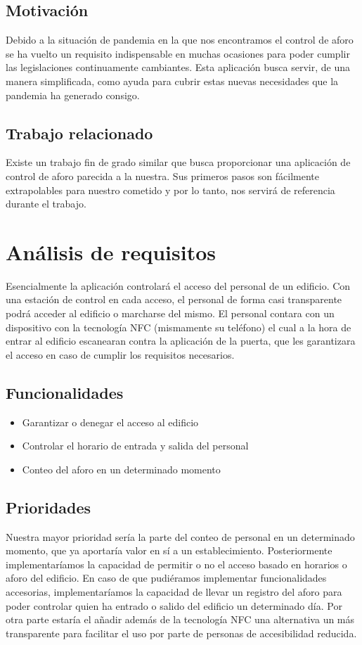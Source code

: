 \documentclass[a4paper,openright,12pt]{article}
\begin{document}
\subsection{Motivación}
Debido a la situación de pandemia en la que nos encontramos el control de aforo se ha vuelto un requisito indispensable en muchas ocasiones para poder cumplir las legislaciones continuamente cambiantes. Esta aplicación busca servir, de una manera simplificada, como ayuda para cubrir estas nuevas necesidades que la pandemia ha generado consigo.

\subsection{Trabajo relacionado}
Existe un trabajo fin de grado similar \cite{Safe-Events} que busca proporcionar una aplicación de control de aforo parecida a la nuestra. Sus primeros pasos son fácilmente extrapolables para nuestro cometido y por lo tanto, nos servirá de referencia durante el trabajo.




\section{Análisis de requisitos}
Esencialmente la aplicación controlará el acceso del personal de un edificio. Con una estación de control en cada acceso, el personal de forma casi transparente podrá acceder al edificio o marcharse del mismo.
El personal contara con un dispositivo con la tecnología NFC (mismamente su teléfono) el cual a la hora de entrar al edificio escanearan contra la aplicación de la puerta, que les garantizara el acceso en caso de cumplir los requisitos necesarios.
\subsection{Funcionalidades}
\begin{itemize}
    \item Garantizar o denegar el acceso al edificio
    \item Controlar el horario de entrada y salida del personal
    \item Conteo del aforo en un determinado momento
\end{itemize}

\subsection{Prioridades}
Nuestra mayor prioridad sería la parte del conteo de personal en un determinado momento, que ya aportaría valor en sí a un establecimiento.
Posteriormente implementaríamos la capacidad de permitir o no el acceso basado en horarios o aforo del edificio.
En caso de que pudiéramos implementar funcionalidades accesorias, implementaríamos la capacidad de llevar un registro del aforo para poder controlar quien ha entrado  o salido del edificio un determinado día. Por otra parte estaría el añadir además de la tecnología NFC una alternativa un más transparente para facilitar el uso por parte de personas de accesibilidad reducida.
\end{document}
